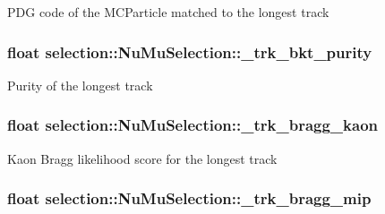 P\-D\-G code of the M\-C\-Particle matched to the longest track \hypertarget{classselection_1_1NuMuSelection_a72c22e0de99d58873fa4e9824e094c50}{
\subsubsection[{\-\_\-trk\-\_\-bkt\-\_\-purity}]{\setlength{\rightskip}{0pt plus 5cm}float selection\-::\-Nu\-Mu\-Selection\-::\-\_\-trk\-\_\-bkt\-\_\-purity\hspace{0.3cm}{\ttfamily [private]}}}\label{classselection_1_1NuMuSelection_a72c22e0de99d58873fa4e9824e094c50}
Purity of the longest track \hypertarget{classselection_1_1NuMuSelection_a8fb54244ae254a42f6238bca2d7fb34e}{
\subsubsection[{\-\_\-trk\-\_\-bragg\-\_\-kaon}]{\setlength{\rightskip}{0pt plus 5cm}float selection\-::\-Nu\-Mu\-Selection\-::\-\_\-trk\-\_\-bragg\-\_\-kaon\hspace{0.3cm}{\ttfamily [private]}}}\label{classselection_1_1NuMuSelection_a8fb54244ae254a42f6238bca2d7fb34e}
Kaon Bragg likelihood score for the longest track \hypertarget{classselection_1_1NuMuSelection_acf6657ef58eba53a46c0a8c9057ff170}{
\subsubsection[{\-\_\-trk\-\_\-bragg\-\_\-mip}]{\setlength{\rightskip}{0pt plus 5cm}float selection\-::\-Nu\-Mu\-Selection\-::\-\_\-trk\-\_\-bragg\-\_\-mip\hspace{0.3cm}{\ttfamily [private]}}}\label{classselection_1_1NuMuSelection_acf6657ef58eba53a46c0a8c9057ff170}
